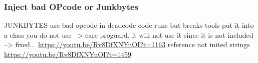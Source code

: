\subsubsection{Inject bad OPcode or Junkbytes}\label{subsubsection:counter-reengineering-break-inject}
JUNKBYTES\newline
use bad opcode in deadcode \newline
code runs but breaks tools\newline
put it into a class you do not use --> care proguard, it will not use it since it is not included\newline
--> fixed...\newline
\url{https://youtu.be/Rv8DfXNYnOI?t=1163}\newline
reference not inited strings\newline
\url{https://youtu.be/Rv8DfXNYnOI?t=1459}
